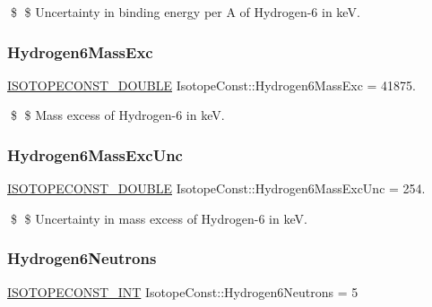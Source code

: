 \$ \$ Uncertainty in binding energy per A of Hydrogen-\/6 in keV. \mbox{\label{group___isotope_const-_hydrogen-_h6_ga28e9629ed4e4145fa25c03fb87c70530}} 
\subsubsection{\texorpdfstring{Hydrogen6\+Mass\+Exc}{Hydrogen6MassExc}}
{\footnotesize\ttfamily \mbox{\hyperlink{group___isotope_const-_macros_ga8f45a7272ce02c0b4c65c44636ed719a}{I\+S\+O\+T\+O\+P\+E\+C\+O\+N\+S\+T\+\_\+\+D\+O\+U\+B\+LE}} Isotope\+Const\+::\+Hydrogen6\+Mass\+Exc = 41875.}

\$ \$ Mass excess of Hydrogen-\/6 in keV. \mbox{\label{group___isotope_const-_hydrogen-_h6_gafd7d4669aa95f8855d706d37982ef06b}} 
\subsubsection{\texorpdfstring{Hydrogen6\+Mass\+Exc\+Unc}{Hydrogen6MassExcUnc}}
{\footnotesize\ttfamily \mbox{\hyperlink{group___isotope_const-_macros_ga8f45a7272ce02c0b4c65c44636ed719a}{I\+S\+O\+T\+O\+P\+E\+C\+O\+N\+S\+T\+\_\+\+D\+O\+U\+B\+LE}} Isotope\+Const\+::\+Hydrogen6\+Mass\+Exc\+Unc = 254.}

\$ \$ Uncertainty in mass excess of Hydrogen-\/6 in keV. \mbox{\label{group___isotope_const-_hydrogen-_h6_ga7074562a919d652fcc5ea42767de80e9}} 
\subsubsection{\texorpdfstring{Hydrogen6\+Neutrons}{Hydrogen6Neutrons}}
{\footnotesize\ttfamily \mbox{\hyperlink{group___isotope_const-_macros_ga5f18360b3e99483a35c32d789e62621c}{I\+S\+O\+T\+O\+P\+E\+C\+O\+N\+S\+T\+\_\+\+I\+NT}} Isotope\+Const\+::\+Hydrogen6\+Neutrons = 5}

